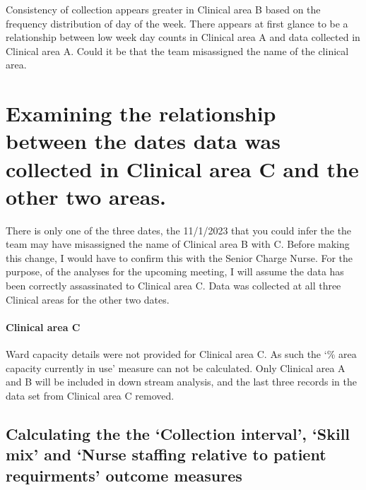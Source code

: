 \documentclass[
]{article}
\begin{document}
Consistency of collection appears greater in Clinical area B based on
the frequency distribution of day of the week. There appears at first
glance to be a relationship between low week day counts in Clinical area
A and data collected in Clinical area A. Could it be that the team
misassigned the name of the clinical area.

\hypertarget{examining-the-relationship-between-the-dates-data-was-collected-in-clinical-area-c-and-the-other-two-areas.}{%
\section{Examining the relationship between the dates data was collected
in Clinical area C and the other two
areas.}\label{examining-the-relationship-between-the-dates-data-was-collected-in-clinical-area-c-and-the-other-two-areas.}}

There is only one of the three dates, the 11/1/2023 that you could infer
the the team may have misassigned the name of Clinical area B with C.
Before making this change, I would have to confirm this with the Senior
Charge Nurse. For the purpose, of the analyses for the upcoming meeting,
I will assume the data has been correctly assassinated to Clinical area
C. Data was collected at all three Clinical areas for the other two
dates.

\hypertarget{clinical-area-c}{%
\paragraph{Clinical area C}\label{clinical-area-c}}

Ward capacity details were not provided for Clinical area C. As such the
`\% area capacity currently in use' measure can not be calculated. Only
Clinical area A and B will be included in down stream analysis, and the
last three records in the data set from Clinical area C removed.

\hypertarget{calculating-the-the-collection-interval-skill-mix-and-nurse-staffing-relative-to-patient-requirments-outcome-measures}{%
\subsection{Calculating the the `Collection interval', `Skill mix' and
`Nurse staffing relative to patient requirments' outcome
measures}\label{calculating-the-the-collection-interval-skill-mix-and-nurse-staffing-relative-to-patient-requirments-outcome-measures}}
\end{document}

